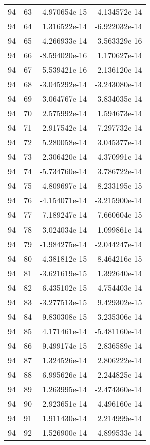 \begin{tabular}{rrrr}
  94 &   63 & -4.970654e-15 &  4.134572e-14 \\
  94 &   64 &  1.316522e-14 & -6.922032e-14 \\
  94 &   65 &  4.266933e-14 & -3.563329e-16 \\
  94 &   66 & -8.594020e-16 &  1.170627e-14 \\
  94 &   67 & -5.539421e-16 &  2.136120e-14 \\
  94 &   68 & -3.045292e-14 & -3.243080e-14 \\
  94 &   69 & -3.064767e-14 &  3.834035e-14 \\
  94 &   70 &  2.575992e-14 &  1.594673e-14 \\
  94 &   71 &  2.917542e-14 &  7.297732e-14 \\
  94 &   72 &  5.280058e-14 &  3.045377e-14 \\
  94 &   73 & -2.306420e-14 &  4.370991e-14 \\
  94 &   74 & -5.734760e-14 &  3.786722e-14 \\
  94 &   75 & -4.809697e-14 &  8.233195e-15 \\
  94 &   76 & -4.154071e-14 & -3.215900e-14 \\
  94 &   77 & -7.189247e-14 & -7.660604e-15 \\
  94 &   78 & -3.024034e-14 &  1.099861e-14 \\
  94 &   79 & -1.984275e-14 & -2.044247e-14 \\
  94 &   80 &  4.381812e-15 & -8.464216e-15 \\
  94 &   81 & -3.621619e-15 &  1.392640e-14 \\
  94 &   82 & -6.435102e-15 & -4.754403e-14 \\
  94 &   83 & -3.277513e-15 &  9.429302e-15 \\
  94 &   84 &  9.830308e-15 &  3.235306e-14 \\
  94 &   85 &  4.171461e-14 & -5.481160e-14 \\
  94 &   86 &  9.499174e-15 & -2.836589e-14 \\
  94 &   87 &  1.324526e-14 &  2.806222e-14 \\
  94 &   88 &  6.995626e-14 &  2.244825e-14 \\
  94 &   89 &  1.263995e-14 & -2.474360e-14 \\
  94 &   90 &  2.923651e-14 &  4.496160e-14 \\
  94 &   91 &  1.911430e-14 &  2.214999e-14 \\
  94 &   92 &  1.526900e-14 &  4.899533e-14 \\

\end{tabular}
